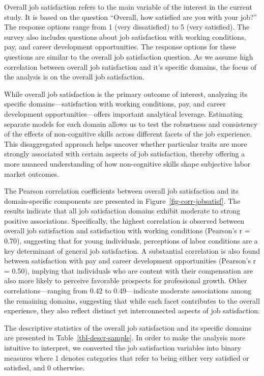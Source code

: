 \documentclass[
]{interact}
\begin{document}
Overall job satisfaction refers to the main variable of the interest in
the current study. It is based on the question ``Overall, how satisfied
are you with your job?'' The response options range from 1 (very
dissatisfied) to 5 (very satisfied). The survey also includes questions
about job satisfaction with working conditions, pay, and career
development opportunities. The response options for these questions are
similar to the overall job satisfaction question. As we assume high
correlation between overall job satisfaction and it's specific domains,
the focus of the analysis is on the overall job satisfaction.

While overall job satisfaction is the primary outcome of interest,
analyzing its specific domains---satisfaction with working conditions,
pay, and career development opportunities---offers important analytical
leverage. Estimating separate models for each domain allows us to test
the robustness and consistency of the effects of non-cognitive skills
across different facets of the job experience. This disaggregated
approach helps uncover whether particular traits are more strongly
associated with certain aspects of job satisfaction, thereby offering a
more nuanced understanding of how non-cognitive skills shape subjective
labor market outcomes.

The Pearson correlation coefficients between overall job satisfaction
and its domain-specific components are presented in
Figure~\ref{fig-corr-jobsatisf}. The results indicate that all job
satisfaction domains exhibit moderate to strong positive associations.
Specifically, the highest correlation is observed between overall job
satisfaction and satisfaction with working conditions (Pearson's r =
0.70), suggesting that for young individuals, perceptions of labor
conditions are a key determinant of general job satisfaction. A
substantial correlation is also found between satisfaction with pay and
career development opportunities (Pearson's r = 0.50), implying that
individuals who are content with their compensation are also more likely
to perceive favorable prospects for professional growth. Other
correlations---ranging from 0.42 to 0.49---indicate moderate
associations among the remaining domains, suggesting that while each
facet contributes to the overall experience, they also reflect distinct
yet interconnected aspects of job satisfaction.

The descriptive statistics of the overall job satisfaction and its
specific domains are presented in Table~\ref{tbl-descr-sample}. In order
to make the analysis more intuitive to interpret, we converted the job
satisfaction variables into binary measures where 1 denotes categories
that refer to being either very satisfied or satisfied, and 0 otherwise.
\end{document}
